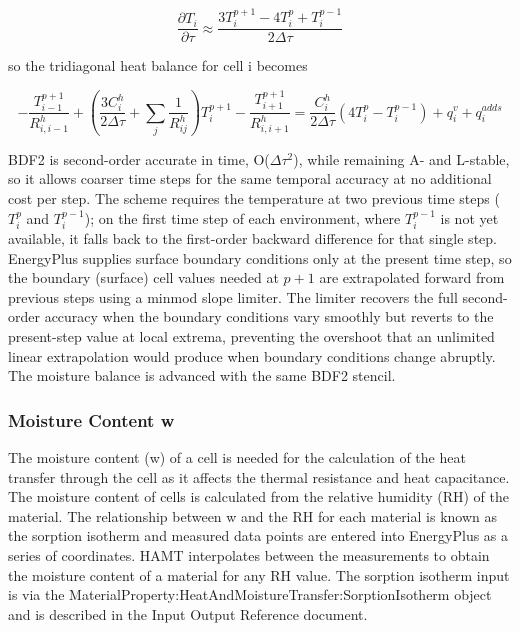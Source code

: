 \begin{equation}
\frac{{\partial T_i}}{{\partial \tau }} \approx \frac{{3 T_i^{p+1} - 4 T_i^p + T_i^{p-1}}}{{2 \Delta \tau }}
\label{eq:BDF2Stencil}
\end{equation}

so the tridiagonal heat balance for cell i becomes

\begin{equation}
- \frac{T_{i-1}^{p+1}}{R_{i,i-1}^h} + \left( {\frac{{3 C_i^h}}{{2 \Delta \tau }} + \sum\limits_j {\frac{1}{{R_{ij}^h}}} } \right)T_i^{p+1} - \frac{T_{i+1}^{p+1}}{R_{i,i+1}^h} = \frac{{C_i^h}}{{2 \Delta \tau }}\left( {4 T_i^p - T_i^{p-1}} \right) + q_i^v + q_i^{adds}
\label{eq:HeatTransferBDF2}
\end{equation}

BDF2 is second-order accurate in time, O(\(\Delta \tau^2\)), while remaining A- and L-stable, so it allows coarser time steps for the same temporal accuracy at no additional cost per step. The scheme requires the temperature at two previous time steps (\(T_i^p\) and \(T_i^{p-1}\)); on the first time step of each environment, where \(T_i^{p-1}\) is not yet available, it falls back to the first-order backward difference for that single step. EnergyPlus supplies surface boundary conditions only at the present time step, so the boundary (surface) cell values needed at \(p+1\) are extrapolated forward from previous steps using a minmod slope limiter. The limiter recovers the full second-order accuracy when the boundary conditions vary smoothly but reverts to the present-step value at local extrema, preventing the overshoot that an unlimited linear extrapolation would produce when boundary conditions change abruptly. The moisture balance is advanced with the same BDF2 stencil.

\subsubsection{Moisture Content w}\label{moisture-content-w}

The moisture content (w) of a cell is needed for the calculation of the heat transfer through the cell as it affects the thermal resistance and heat capacitance. The moisture content of cells is calculated from the relative humidity (RH) of the material. The relationship between w and the RH for each material is known as the sorption isotherm and measured data points are entered into EnergyPlus as a series of coordinates. HAMT interpolates between the measurements to obtain the moisture content of a material for any RH value. The sorption isotherm input is via the MaterialProperty:HeatAndMoistureTransfer:SorptionIsotherm object and is described in the Input Output Reference document.

